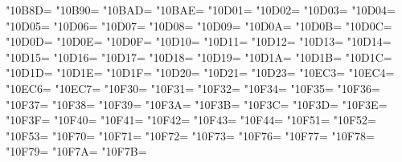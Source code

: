 \XeTeXcharclass"10B8D=\KclassArabD
\XeTeXcharclass"10B90=\KclassArabD
\XeTeXcharclass"10BAD=\KclassArabD
\XeTeXcharclass"10BAE=\KclassArabD
\XeTeXcharclass"10D01=\KclassArabD
\XeTeXcharclass"10D02=\KclassArabD
\XeTeXcharclass"10D03=\KclassArabD
\XeTeXcharclass"10D04=\KclassArabD
\XeTeXcharclass"10D05=\KclassArabD
\XeTeXcharclass"10D06=\KclassArabD
\XeTeXcharclass"10D07=\KclassArabD
\XeTeXcharclass"10D08=\KclassArabD
\XeTeXcharclass"10D09=\KclassArabD
\XeTeXcharclass"10D0A=\KclassArabD
\XeTeXcharclass"10D0B=\KclassArabD
\XeTeXcharclass"10D0C=\KclassArabD
\XeTeXcharclass"10D0D=\KclassArabD
\XeTeXcharclass"10D0E=\KclassArabD
\XeTeXcharclass"10D0F=\KclassArabD
\XeTeXcharclass"10D10=\KclassArabD
\XeTeXcharclass"10D11=\KclassArabD
\XeTeXcharclass"10D12=\KclassArabD
\XeTeXcharclass"10D13=\KclassArabD
\XeTeXcharclass"10D14=\KclassArabD
\XeTeXcharclass"10D15=\KclassArabD
\XeTeXcharclass"10D16=\KclassArabD
\XeTeXcharclass"10D17=\KclassArabD
\XeTeXcharclass"10D18=\KclassArabD
\XeTeXcharclass"10D19=\KclassArabD
\XeTeXcharclass"10D1A=\KclassArabD
\XeTeXcharclass"10D1B=\KclassArabD
\XeTeXcharclass"10D1C=\KclassArabD
\XeTeXcharclass"10D1D=\KclassArabD
\XeTeXcharclass"10D1E=\KclassArabD
\XeTeXcharclass"10D1F=\KclassArabD
\XeTeXcharclass"10D20=\KclassArabD
\XeTeXcharclass"10D21=\KclassArabD
\XeTeXcharclass"10D23=\KclassArabD
\XeTeXcharclass"10EC3=\KclassArabD
\XeTeXcharclass"10EC4=\KclassArabD
\XeTeXcharclass"10EC6=\KclassArabD
\XeTeXcharclass"10EC7=\KclassArabD
\XeTeXcharclass"10F30=\KclassArabD
\XeTeXcharclass"10F31=\KclassArabD
\XeTeXcharclass"10F32=\KclassArabD
\XeTeXcharclass"10F34=\KclassArabD
\XeTeXcharclass"10F35=\KclassArabD
\XeTeXcharclass"10F36=\KclassArabD
\XeTeXcharclass"10F37=\KclassArabD
\XeTeXcharclass"10F38=\KclassArabD
\XeTeXcharclass"10F39=\KclassArabD
\XeTeXcharclass"10F3A=\KclassArabD
\XeTeXcharclass"10F3B=\KclassArabD
\XeTeXcharclass"10F3C=\KclassArabD
\XeTeXcharclass"10F3D=\KclassArabD
\XeTeXcharclass"10F3E=\KclassArabD
\XeTeXcharclass"10F3F=\KclassArabD
\XeTeXcharclass"10F40=\KclassArabD
\XeTeXcharclass"10F41=\KclassArabD
\XeTeXcharclass"10F42=\KclassArabD
\XeTeXcharclass"10F43=\KclassArabD
\XeTeXcharclass"10F44=\KclassArabD
\XeTeXcharclass"10F51=\KclassArabD
\XeTeXcharclass"10F52=\KclassArabD
\XeTeXcharclass"10F53=\KclassArabD
\XeTeXcharclass"10F70=\KclassArabD
\XeTeXcharclass"10F71=\KclassArabD
\XeTeXcharclass"10F72=\KclassArabD
\XeTeXcharclass"10F73=\KclassArabD
\XeTeXcharclass"10F76=\KclassArabD
\XeTeXcharclass"10F77=\KclassArabD
\XeTeXcharclass"10F78=\KclassArabD
\XeTeXcharclass"10F79=\KclassArabD
\XeTeXcharclass"10F7A=\KclassArabD
\XeTeXcharclass"10F7B=\KclassArabD
